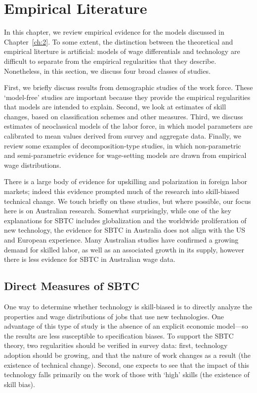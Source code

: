 \chapter{Empirical Literature}\label{ch:3}

In this chapter, we review empirical evidence for the models discussed in Chapter~\ref{ch:2}. To some extent, the distinction between the theoretical and empirical literture is artificial: models of wage differentials and technology are difficult to separate from the empirical regularities that they describe. Nonetheless, in this section, we discuss four broad classes of studies.

First, we briefly discuss results from demographic studies of the work force. These `model-free' studies are important because they provide the empirical regularities that models are intended to explain. Second, we look at estimates of skill changes, based on classification schemes and other measures. Third, we discuss estimates of neoclassical models of the labor force, in which model parameters are calibrated to mean values derived from survey and aggregate data. Finally, we review some examples of decomposition-type studies, in which non-parametric and semi-parametric evidence for wage-setting models are drawn from empirical wage distributions.

There is a large body of evidence for upskilling and polarization in foreign labor markets; indeed this evidence prompted much of the research into skill-biased technical change. We touch briefly on these studies, but where possible, our focus here is on Australian research. Somewhat surprisingly, while one of the key explanations for SBTC includes globalization and the worldwide proliferation of new technology, the evidence for SBTC in Australia does not align with the US and European experience. Many Australian studies have confirmed a growing demand for skilled labor, as well as an associated growth in its supply, however there is less evidence for SBTC in Australian wage data.

\section{Direct Measures of SBTC}\label{sec:ethnographic}

One way to determine whether technology is skill-biased is to directly analyze the properties and wage distributions of jobs that use new technologies. One advantage of this type of study is the absence of an explicit economic model---so the results are less susceptible to specification biases. To support the SBTC theory, two regularities should be verified in survey data: first, technology adoption should be growing, and that the nature of work changes as a result (the existence of technical change). Second, one expects to see that the impact of this technology falls primarily on the work of those with `high' skills (the existence of skill bias).

